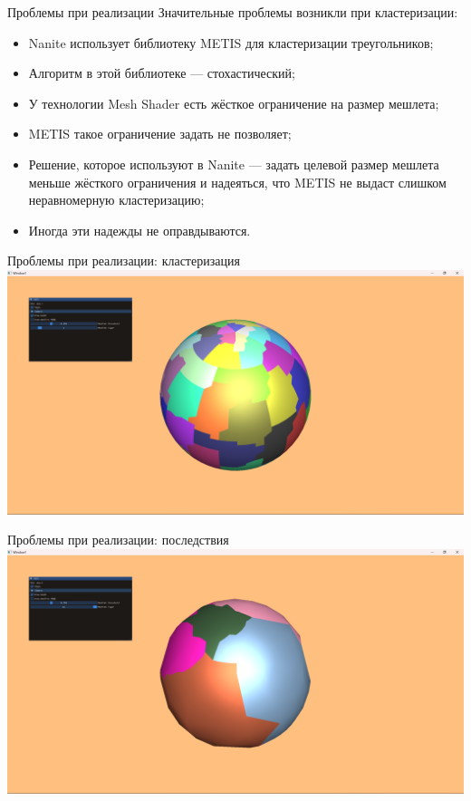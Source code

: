 \documentclass{beamer}
\begin{document}
    \begin{frame}{Проблемы при реализации}
        Значительные проблемы возникли при кластеризации:
        \begin{itemize}
            \item Nanite использует библиотеку METIS для кластеризации треугольников;
            \item Алгоритм в этой библиотеке --- стохастический;
            \item У технологии Mesh Shader есть жёсткое ограничение на размер мешлета;
            \item METIS такое ограничение задать не позволяет;
            \item Решение, которое используют в Nanite --- задать целевой размер мешлета меньше жёсткого ограничения и надеяться, что METIS не выдаст слишком неравномерную кластеризацию;
            \item Иногда эти надежды не оправдываются.
        \end{itemize}
    \end{frame}

    \begin{frame}{Проблемы при реализации: кластеризация}
        \includegraphics[width=\textwidth]{sphere0.png}
    \end{frame}

    \begin{frame}{Проблемы при реализации: последствия}
        \includegraphics[width=\textwidth]{sphere1.png}
    \end{frame}
\end{document}
